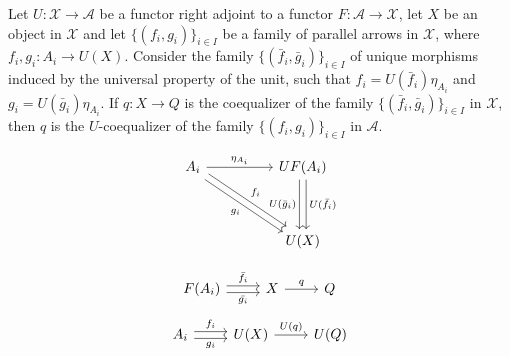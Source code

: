 \begin{mainbox}{}
    \begin{lemma}\label{U-coeq}
        Let $U:\mathcal{X} \to \mathcal{A}$ be a functor right adjoint to a functor $F:\mathcal{A} \to \mathcal{X}$, let $X$ be an object in $\mathcal{X}$ and let $\{(f_i,g_i)\}_{i\in I}$ be a family of parallel arrows in $\mathcal{X}$, where $f_i,g_i: A_i \to U(X)$. Consider the family $\{(\bar{f}_i,\bar{g}_i)\}_{i\in I}$ of unique morphisms induced by the universal property of the unit, such that $f_i=U(\bar{f}_i)\eta_{A_i}$ and $g_i=U(\bar{g}_i)\eta_{A_i}$. If $q:X \to Q$ is the coequalizer of the family $\{(\bar{f}_i,\bar{g}_i)\}_{i\in I}$ in $\mathcal{X}$, then $q$ is the $U$-coequalizer of the family $\{(f_i,g_i)\}_{i\in I}$ in $\mathcal{A}$.
       
        \begin{minipage}{0.5\textwidth}
\[
\begin{tikzcd}
A_i \arrow[rr, "\eta_{A_i}"] \arrow[rrdd, "f_i", shift left] \arrow[rrdd, "g_i"', shift right] &  & UF(A_i) \arrow[dd, "U(\bar{f}_i)", shift left] \arrow[dd, "U(\bar{g}_i)"', shift right] \\
                                                                                               &  &                                                                                         \\
                                                                                               &  & U(X)                                                                                   
\end{tikzcd}
\]
        \end{minipage}
        \begin{minipage}{0.5\textwidth}
\[
\begin{tikzcd}
F(A_i) \arrow[r, "\bar{f}_i", shift left] \arrow[r, "\bar{g_i}"', shift right] & X \arrow[r, "q"] & Q
\end{tikzcd}
\]
\[
\begin{tikzcd}
A_i \arrow[r, "f_i", shift left] \arrow[r, "g_i"', shift right] & U(X) \arrow[r, "U(q)"] & U(Q)
\end{tikzcd}
\]
        \end{minipage}
    \end{lemma}
\end{mainbox}

